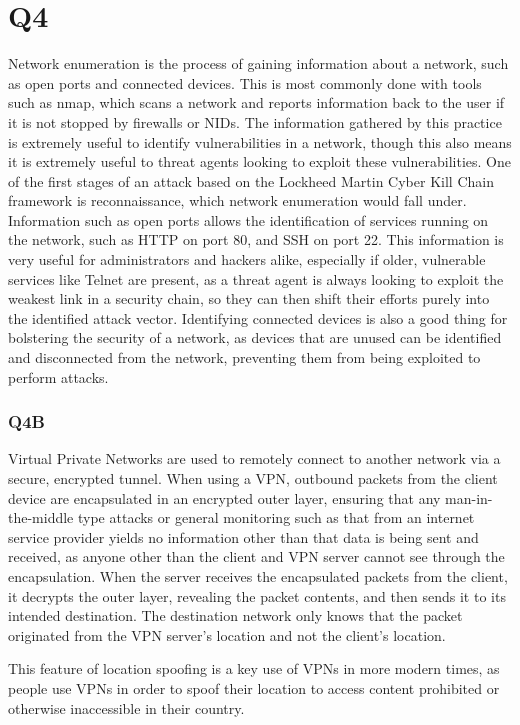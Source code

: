 \documentclass[12pt]{report}
\begin{document}
\section{Q4}
Network enumeration is the process of gaining information about a network, such as open ports and connected devices. This is most commonly done with tools such as nmap, which scans a network and reports information back to the user if it is not stopped by firewalls or NIDs. The information gathered by this practice is extremely useful to identify vulnerabilities in a network, though this also means it is extremely useful to threat agents looking to exploit these vulnerabilities. One of the first stages of an attack based on the Lockheed Martin Cyber Kill Chain framework is reconnaissance, which network enumeration would fall under. Information such as open ports allows the identification of services running on the network, such as HTTP on port 80, and SSH on port 22. This information is very useful for administrators and hackers alike, especially if older, vulnerable services like Telnet are present, as a threat agent is always looking to exploit the weakest link in a security chain, so they can then shift their efforts purely into the identified attack vector. Identifying connected devices is also a good thing for bolstering the security of a network, as devices that are unused can be identified and disconnected from the network, preventing them from being exploited to perform attacks.

\subsubsection{Q4B}
Virtual Private Networks are used to remotely connect to another network via a secure, encrypted tunnel. When using a VPN, outbound packets from the client device are encapsulated in an encrypted outer layer, ensuring that any man-in-the-middle type attacks or general monitoring such as that from an internet service provider yields no information other than that data is being sent and received, as anyone other than the client and VPN server cannot see through the encapsulation. When the server receives the encapsulated packets from the client, it decrypts the outer layer, revealing the packet contents, and then sends it to its intended destination. The destination network only knows that the packet originated from the VPN server's location and not the client's location.

This feature of location spoofing is a key use of VPNs in more modern times, as people use VPNs in order to spoof their location to access content prohibited or otherwise inaccessible in their country.
\end{document}
